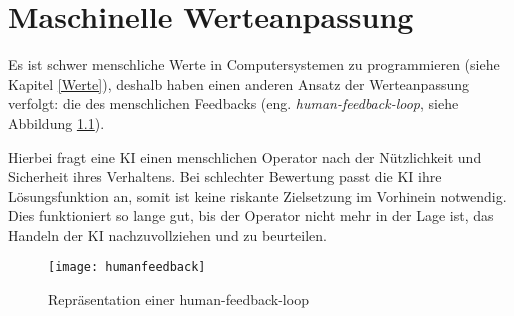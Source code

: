 \chapter{Maschinelle Werteanpassung}

Es ist schwer menschliche Werte in Computersystemen zu programmieren (siehe Kapitel \ref{Werte}), deshalb haben \citeauthor{irving_ai_2018} einen anderen Ansatz der Werteanpassung verfolgt: die des menschlichen Feedbacks (eng. \emph{human-feedback-loop}, siehe Abbildung \ref{humanfeedbackimg}).

Hierbei fragt eine KI einen menschlichen Operator nach der Nützlichkeit und Sicherheit ihres Verhaltens. Bei schlechter Bewertung passt die KI ihre Lösungsfunktion an, somit ist keine riskante Zielsetzung im Vorhinein notwendig.  Dies funktioniert so lange gut, bis der Operator nicht mehr in der Lage ist, das Handeln der KI nachzuvollziehen und zu beurteilen. 

\begin{figure}
  \texttt{[image: humanfeedback]}
  \caption{Repräsentation einer human-feedback-loop}
  \label{humanfeedbackimg}
\end{figure}





